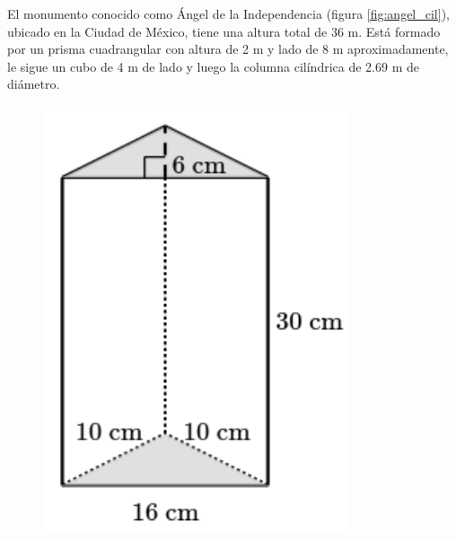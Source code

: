 El monumento conocido como Ángel de la Independencia (figura \ref{fig:angel_cil}), ubicado en
la Ciudad de México, tiene una altura total de 36 m. Está formado por un prisma
cuadrangular con altura de 2 m y lado de 8 m aproximadamente, le sigue un cubo de 4 m de lado y luego la columna cilíndrica de 2.69 m de diámetro.


\begin{minipage}{0.3\linewidth}
    \begin{figure}[H]
        \begin{center}
            \includegraphics[width=0.8\textwidth]{../images/prob_verb_superficie_01}
        \end{center}
        \caption{}
        \label{fig:prob_verb_superficie_01}
    \end{figure}
\end{minipage}
